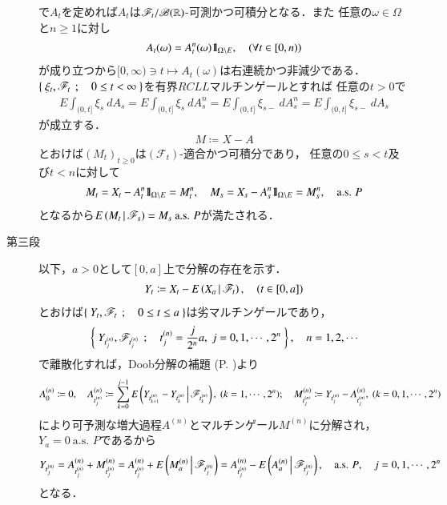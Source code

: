 \begin{prf}[未修正]
\begin{description}
				で$A_t$を定めれば$A_t$は$\mathscr{F}_t/\mathscr{B}(\mathbb{R})$-可測かつ可積分となる．また
				任意の$\omega \in \Omega$と$n \geq 1$に対し
				\begin{align}
					A_t(\omega) = A^n_t(\omega) \mbox{1}\hspace{-0.25em}\mbox{l}_{\Omega \backslash E}, \quad (\forall t \in [0,n))
				\end{align}
				が成り立つから$[0,\infty) \ni t \longmapsto A_t(\omega)$は右連続かつ非減少である．
				$\left\{\ \xi_t,\mathscr{F}_t\ \, ; \quad 0 \leq t < \infty\ \right\}$を有界$RCLL$マルチンゲールとすれば
				任意の$t > 0$で
				\begin{align}
					E \int_{(0,t]} \xi_s\ dA_s = E \int_{(0,t]} \xi_s\ dA^n_s 
					= E \int_{(0,t]} \xi_{s-}\ dA^n_s = E \int_{(0,t]} \xi_{s-}\ dA_s
				\end{align}
				が成立する．
				\begin{align}
					M \coloneqq X - A
				\end{align}
				とおけば$(M_t)_{t \geq 0}$は$(\mathscr{F}_t)$-適合かつ可積分であり，
				任意の$0 \leq s < t$及び$t < n$に対して
				\begin{align}
					M_t = X_t - A^n_t \mbox{1}\hspace{-0.25em}\mbox{l}_{\Omega \backslash E} = M^n_t,
					\quad M_s = X_s - A^n_s \mbox{1}\hspace{-0.25em}\mbox{l}_{\Omega \backslash E} = M^n_s,
					\quad \mbox{a.s. $P$}
				\end{align}
				となるから$E\left( M_t \, \middle|\, \mathscr{F}_s \right) = M_s\ \mbox{a.s. $P$}$が満たされる．
			
			\item[第三段]
				以下，$a > 0$として$[0,a]$上で分解の存在を示す．
				\begin{align}
					Y_t \coloneqq X_t - E\left( X_a \, \middle|\, \mathscr{F}_t \right),
					\quad (t \in [0,a])
				\end{align}
				とおけば$\left\{\ Y_t,\mathscr{F}_t\ \, ; \quad 0 \leq t \leq a\ \right\}$は劣マルチンゲールであり，
				\begin{align}
					\left\{\ Y_{t^{(n)}_j},\mathscr{F}_{t^{(n)}_j}\ \, ; \quad t^{(n)}_j = \frac{j}{2^n}a,\ j=0,1,\cdots,2^n\ \right\},
					\quad n=1,2,\cdots
				\end{align}
				で離散化すれば，Doob分解の補題 (P. \pageref{lem:Doob_decomposition})より
				\begin{align}
					A^{(n)}_0 \coloneqq 0,
					\quad A^{(n)}_{t^{(n)}_j} \coloneqq \sum_{k=0}^{j-1} E\left( Y_{t^{(n)}_{k+1}} - Y_{t^{(n)}_k} \, \middle|\, \mathscr{F}_{t^{(n)}_k} \right),
					\ (k=1,\cdots,2^n);
					\quad M^{(n)}_{t^{(n)}_j} \coloneqq Y_{t^{(n)}_j} - A^{(n)}_{t^{(n)}_j},
					\ (k=0,1,\cdots,2^n)
				\end{align}
				により可予測な増大過程$A^{(n)}$とマルチンゲール$M^{(n)}$に分解され，
				$Y_a = 0\ \mbox{a.s. $P$}$であるから
				\begin{align}
					Y_{t^{(n)}_j} = A^{(n)}_{t^{(n)}_j} +  M^{(n)}_{t^{(n)}_j}
					= A^{(n)}_{t^{(n)}_j} + E\left( M^{(n)}_a \, \middle|\, \mathscr{F}_{t^{(n)}_j} \right)
					= A^{(n)}_{t^{(n)}_j} - E\left( A^{(n)}_a \, \middle|\, \mathscr{F}_{t^{(n)}_j} \right),
					\quad \mbox{a.s. $P$},
					\quad j=0,1,\cdots,2^n
				\end{align}
				となる．
				

\end{description}
\end{prf}
